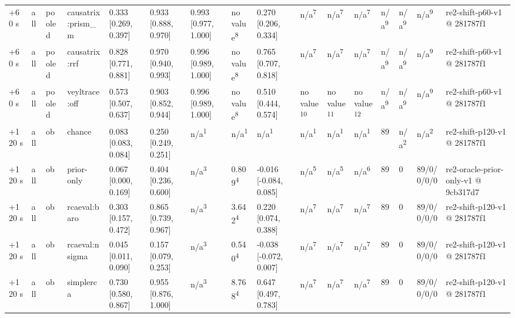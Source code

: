 \begin{table}[t]
\begin{tabular}{llllllllllllllll}
+60 s & all & pooled & causatrix:prism\_m & 0.333 [0.269, 0.397] & 0.933 [0.888, 0.970] & 0.993 [0.977, 1.000] & no value\textsuperscript{8} & 0.270 [0.206, 0.334] & n/a\textsuperscript{7} & n/a\textsuperscript{7} & n/a\textsuperscript{7} & n/a\textsuperscript{9} & n/a\textsuperscript{9} & n/a\textsuperscript{9} & re2-shift-p60-v1 @ 281787f1 \\
+60 s & all & pooled & causatrix:rrf & 0.828 [0.771, 0.881] & 0.970 [0.940, 0.993] & 0.996 [0.989, 1.000] & no value\textsuperscript{8} & 0.765 [0.707, 0.818] & n/a\textsuperscript{7} & n/a\textsuperscript{7} & n/a\textsuperscript{7} & n/a\textsuperscript{9} & n/a\textsuperscript{9} & n/a\textsuperscript{9} & re2-shift-p60-v1 @ 281787f1 \\
+60 s & all & pooled & veyltrace:off & 0.573 [0.507, 0.637] & 0.903 [0.852, 0.944] & 0.996 [0.989, 1.000] & no value\textsuperscript{8} & 0.510 [0.444, 0.574] & no value\textsuperscript{10} & no value\textsuperscript{11} & no value\textsuperscript{12} & n/a\textsuperscript{9} & n/a\textsuperscript{9} & n/a\textsuperscript{9} & re2-shift-p60-v1 @ 281787f1 \\
+120 s & all & ob & chance & 0.083 [0.083, 0.084] & 0.250 [0.249, 0.251] & n/a\textsuperscript{1} & n/a\textsuperscript{1} & n/a\textsuperscript{1} & n/a\textsuperscript{1} & n/a\textsuperscript{1} & n/a\textsuperscript{1} & 89 & n/a\textsuperscript{2} & n/a\textsuperscript{2} & re2-shift-p120-v1 @ 281787f1 \\
+120 s & all & ob & prior-only & 0.067 [0.000, 0.169] & 0.404 [0.236, 0.600] & n/a\textsuperscript{3} & 0.809\textsuperscript{4} & -0.016 [-0.084, 0.085] & n/a\textsuperscript{5} & n/a\textsuperscript{5} & n/a\textsuperscript{6} & 89 & 0 & 89/0/0/0/0 & re2-oracle-prior-only-v1 @ 9cb317d7 \\
+120 s & all & ob & rcaeval:baro & 0.303 [0.157, 0.472] & 0.865 [0.739, 0.967] & n/a\textsuperscript{3} & 3.642\textsuperscript{4} & 0.220 [0.074, 0.388] & n/a\textsuperscript{7} & n/a\textsuperscript{7} & n/a\textsuperscript{7} & 89 & 0 & 89/0/0/0/0 & re2-shift-p120-v1 @ 281787f1 \\
+120 s & all & ob & rcaeval:nsigma & 0.045 [0.011, 0.090] & 0.157 [0.079, 0.253] & n/a\textsuperscript{3} & 0.540\textsuperscript{4} & -0.038 [-0.072, 0.007] & n/a\textsuperscript{7} & n/a\textsuperscript{7} & n/a\textsuperscript{7} & 89 & 0 & 89/0/0/0/0 & re2-shift-p120-v1 @ 281787f1 \\
+120 s & all & ob & simplerca & 0.730 [0.580, 0.867] & 0.955 [0.876, 1.000] & n/a\textsuperscript{3} & 8.768\textsuperscript{4} & 0.647 [0.497, 0.783] & n/a\textsuperscript{7} & n/a\textsuperscript{7} & n/a\textsuperscript{7} & 89 & 0 & 89/0/0/0/0 & re2-shift-p120-v1 @ 281787f1 \\

\end{tabular}
\end{table}
